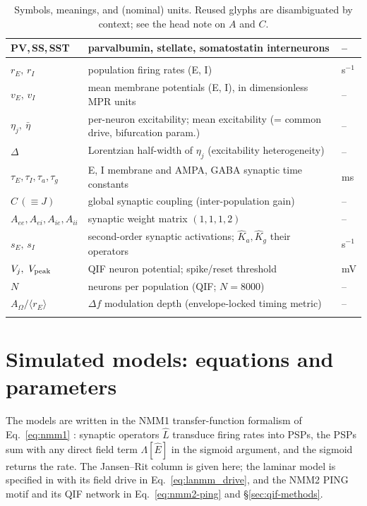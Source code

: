 \documentclass[11pt,a4paper]{article}
\begin{document}
{\begin{longtable}{@{}>{\raggedright\arraybackslash}p{} >{\raggedright\arraybackslash}p{} >{\raggedright\arraybackslash}p{}@{}}
PV,\,SS,\,SST & parvalbumin, stellate, somatostatin interneurons & -- \\
\midrule \multicolumn{3}{@{}l}{\textit{Exact mean field (NMM2 / MPR) and QIF network}} \\*
$r_E,\,r_I$ & population firing rates (E, I) & s$^{-1}$ \\
$v_E,\,v_I$ & mean membrane potentials (E, I), in dimensionless MPR units & -- \\
$\eta_j,\ \bar\eta$ & per-neuron excitability; mean excitability (= common drive, bifurcation param.) & -- \\
$\Delta$ & Lorentzian half-width of $\eta_j$ (excitability heterogeneity) & -- \\
$\tau_E,\tau_I,\tau_a,\tau_g$ & E, I membrane and AMPA, GABA synaptic time constants & ms \\
$C\,(\equiv J)$ & global synaptic coupling (inter-population gain) & -- \\
$A_{ee},A_{ei},A_{ie},A_{ii}$ & synaptic weight matrix $(1,1,1,2)$ & -- \\
$s_E,\,s_I$ & second-order synaptic activations; $\hat K_a,\hat K_g$ their operators & s$^{-1}$ \\
$V_j,\ V_{\rm peak}$ & QIF neuron potential; spike/reset threshold & mV \\
$N$ & neurons per population (QIF; $N=8000$) & -- \\
$A_\Omega/\langle r_E\rangle$ & $\Delta f$ modulation depth (envelope-locked timing metric) & -- \\
\bottomrule
\caption{Symbols, meanings, and (nominal) units. Reused glyphs are disambiguated by
context; see the head note on $A$ and $C$.}\label{tab:notation}
\end{longtable}}

\section{Simulated models: equations and parameters}\label{app:models}
The models are written in the NMM1 transfer-function formalism of Eq.~\eqref{eq:nmm1}
\cite{ruffini2025rosetta}: synaptic operators $\hat L$ transduce firing rates into PSPs, the
PSPs sum with any direct field term $\Lambda[\hat E]$ in the sigmoid argument, and the sigmoid
returns the rate. The Jansen--Rit column is given here; the laminar model is specified in
\cite{ruffini2025cfc,sanchezTodo2023} with its field drive in Eq.~\eqref{eq:lanmm_drive}, and
the NMM2 PING motif and its QIF network in Eq.~\eqref{eq:nmm2-ping} and \S\ref{sec:qif-methods}.
\end{document}
